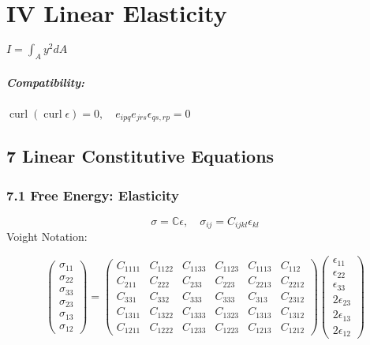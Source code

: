 \hypertarget{iv-linear-elasticity}{%
\section{IV Linear Elasticity}\label{iv-linear-elasticity}}

\(I=\int_{A} y^{2} d A\)

\hypertarget{compatibility}{%
\subparagraph{Compatibility:}\label{compatibility}}

\(\operatorname{curl}(\operatorname{curl} \epsilon)=0, \quad e_{i p q} e_{j r s} \epsilon_{q s, r p}=0\)

\hypertarget{linear-constitutive-equations}{%
\subsection{7 Linear Constitutive
Equations}\label{linear-constitutive-equations}}

\hypertarget{free-energy-elasticity}{%
\subsubsection{7.1 Free Energy:
Elasticity}\label{free-energy-elasticity}}

\[\sigma=\mathbb{C} \epsilon, \quad \sigma_{i j}=C_{i j k l} \epsilon_{k l}\]
Voight Notation:

\[\left(\begin{array}{l}{\sigma_{11}} \\ {\sigma_{22}} \\ {\sigma_{33}} \\ {\sigma_{23}} \\ {\sigma_{13}} \\ {\sigma_{12}}\end{array}\right)=\left(\begin{array}{cccccc}{C_{1111}} & {C_{1122}} & {C_{1133}} & {C_{1123}} & {C_{1113}} & {C_{112}} \\ {C_{211}} & {C_{222}} & {C_{233}} & {C_{223}} & {C_{2213}} & {C_{2212}} \\ {C_{331}} & {C_{332}} & {C_{333}} & {C_{333}} & {C_{313}} & {C_{2312}} \\ {C_{1311}} & {C_{1322}} & {C_{1333}} & {C_{1323}} & {C_{1313}} & {C_{1312}} \\ {C_{1211}} & {C_{1222}} & {C_{1233}} & {C_{1223}} & {C_{1213}} & {C_{1212}}\end{array}\right)\left(\begin{array}{c}{\epsilon_{11}} \\ {\epsilon_{22}} \\ {\epsilon_{33}} \\ {2 \epsilon_{23}} \\ {2 \epsilon_{13}} \\ {2 \epsilon_{12}}\end{array}\right)\]

